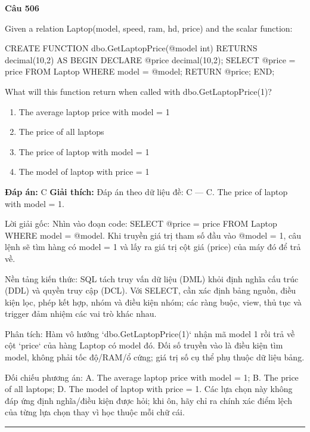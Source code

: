 \documentclass[11pt,a4paper]{article}
\newenvironment{question}[1]{%
  \par\vspace{1em}\noindent\textbf{\large Câu #1}\par\vspace{0.4em}
}{%
  \par\vspace{1em}\hrule\vspace{0.6em}
}
\newenvironment{choices}{%
  \begin{enumerate}[label=\textbf{\Alph*.},leftmargin=2.2em,itemsep=2pt,topsep=3pt]
}{%
  \end{enumerate}
}
\newcommand{\choice}{\item}
\newenvironment{codebox}{%
  \begin{tcolorbox}[colback=gray!8!white,colframe=gray!50!black,arc=1.5mm,boxrule=0.6pt,left=3mm,right=3mm,top=2.5mm,bottom=2.5mm]
  \ttfamily\small
}{%
  \end{tcolorbox}
}
\begin{document}
\begin{question}{506}
Given a relation Laptop(model, speed, ram, hd, price) and the scalar function:
\begin{codebox}
CREATE FUNCTION dbo.GetLaptopPrice(@model int)
RETURNS decimal(10,2) AS
BEGIN
    DECLARE @price decimal(10,2);
    SELECT @price = price FROM Laptop WHERE model = @model;
    RETURN @price;
END;
\end{codebox}
What will this function return when called with dbo.GetLaptopPrice(1)?
\begin{choices}
\choice The average laptop price with model = 1
\choice The price of all laptops
\choice The price of laptop with model = 1
\choice The model of laptop with price = 1
\end{choices}
\textbf{Đáp án:} C
\textbf{Giải thích:} Đáp án theo dữ liệu đề: C — C. The price of laptop with model = 1.

Lời giải gốc: Nhìn vào đoạn code: SELECT @price = price FROM Laptop WHERE model = @model. Khi truyền giá trị tham số đầu vào @model = 1, câu lệnh sẽ tìm hàng có model = 1 và lấy ra giá trị cột giá (price) của máy đó để trả về.

Nền tảng kiến thức: SQL tách truy vấn dữ liệu (DML) khỏi định nghĩa cấu trúc (DDL) và quyền truy cập (DCL). Với SELECT, cần xác định bảng nguồn, điều kiện lọc, phép kết hợp, nhóm và điều kiện nhóm; các ràng buộc, view, thủ tục và trigger đảm nhiệm các vai trò khác nhau.

Phân tích: Hàm vô hướng `dbo.GetLaptopPrice(1)` nhận mã model 1 rồi trả về cột `price` của hàng Laptop có model đó. Đối số truyền vào là điều kiện tìm model, không phải tốc độ/RAM/ổ cứng; giá trị số cụ thể phụ thuộc dữ liệu bảng.

Đối chiếu phương án: A. The average laptop price with model = 1; B. The price of all laptops; D. The model of laptop with price = 1. Các lựa chọn này không đáp ứng định nghĩa/điều kiện được hỏi; khi ôn, hãy chỉ ra chính xác điểm lệch của từng lựa chọn thay vì học thuộc mỗi chữ cái.
\end{question}
\end{document}
